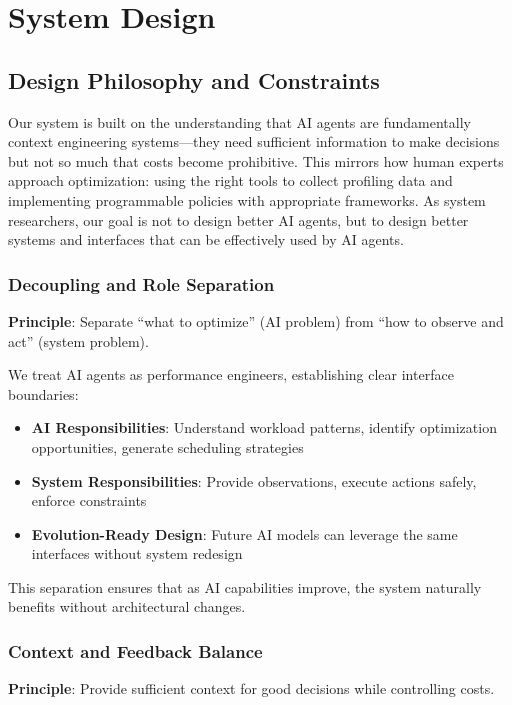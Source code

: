 \section{System Design}

\subsection{Design Philosophy and Constraints}

Our system is built on the understanding that AI agents are fundamentally context engineering systems—they need sufficient information to make decisions but not so much that costs become prohibitive. This mirrors how human experts approach optimization: using the right tools to collect profiling data and implementing programmable policies with appropriate frameworks. As system researchers, our goal is not to design better AI agents, but to design better systems and interfaces that can be effectively used by AI agents.

\subsubsection{Decoupling and Role Separation}
\textbf{Principle}: Separate ``what to optimize'' (AI problem) from ``how to observe and act'' (system problem).

We treat AI agents as performance engineers, establishing clear interface boundaries:
\begin{itemize}
\item \textbf{AI Responsibilities}: Understand workload patterns, identify optimization opportunities, generate scheduling strategies
\item \textbf{System Responsibilities}: Provide observations, execute actions safely, enforce constraints
\item \textbf{Evolution-Ready Design}: Future AI models can leverage the same interfaces without system redesign
\end{itemize}

This separation ensures that as AI capabilities improve, the system naturally benefits without architectural changes.

\subsubsection{Context and Feedback Balance}
\textbf{Principle}: Provide sufficient context for good decisions while controlling costs.

